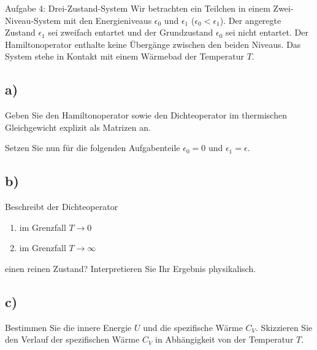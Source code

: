 \begin{aufgabe}{Aufgabe 4: Drei-Zustand-System}
    Wir betrachten ein Teilchen in einem Zwei-Niveau-System mit den Energieniveaus $\epsilon_0$ und $\epsilon_1$ ($\epsilon_0 < \epsilon_1$).
    Der angeregte Zustand $\epsilon_1$ sei zweifach entartet und der Grundzustand $\epsilon_0$ sei nicht entartet.
    Der Hamiltonoperator enthalte keine Übergänge zwischen den beiden Niveaus.
    Das System stehe in Kontakt mit einem Wärmebad der Temperatur $T$.

    \subsection{a)}
    Geben Sie den Hamiltonoperator sowie den Dichteoperator im thermischen Gleichgewicht explizit als Matrizen an.


    Setzen Sie nun für die folgenden Aufgabenteile $\epsilon_0 = 0$ und $\epsilon_1 = \epsilon$.

    \subsection{b)}
    Beschreibt der Dichteoperator
    \begin{enumerate}[label=(\roman*)]
        \item im Grenzfall $T \to 0$
        \item im Grenzfall $T \to \infty$
    \end{enumerate}
    einen reinen Zustand?
    Interpretieren Sie Ihr Ergebnis physikalisch.

    \subsection{c)}
    Bestimmen Sie die innere Energie $U$ und die spezifische Wärme $C_V$.
    Skizzieren Sie den Verlauf der spezifischen Wärme $C_V$ in Abhängigkeit von der Temperatur $T$.
\end{aufgabe}


